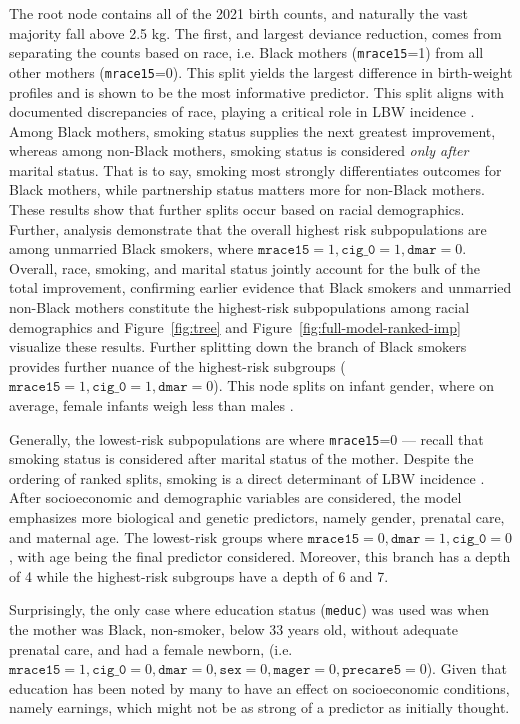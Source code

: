 The root node contains all of the 2021 birth counts, and naturally the vast majority fall above 2.5 kg. The first, and largest deviance reduction, comes from separating the counts based on race, i.e. Black mothers (\texttt{mrace15}=1) from all other mothers (\texttt{mrace15}=0). This split yields the largest difference in birth-weight profiles and is shown to be the most informative predictor. This split aligns with documented discrepancies of race, playing a critical role in LBW incidence \parencite{kff_maternal_infant_health_a, pmc1751798}. Among Black mothers, smoking status supplies the next greatest improvement, whereas among non-Black mothers, smoking status is considered \emph{only after} marital status. That is to say, smoking most strongly differentiates outcomes for Black mothers, while partnership status matters more for non-Black mothers. These results show that further splits occur based on racial demographics. Further, analysis demonstrate that the overall highest risk subpopulations are among unmarried Black smokers, where \(\texttt{mrace15}=1,\texttt{cig\_0}=1, \texttt{dmar}=0\). Overall, race, smoking, and marital status jointly account for the bulk of the total improvement, confirming earlier evidence that Black smokers and unmarried non-Black mothers constitute the highest-risk subpopulations among racial demographics \parencite{kff_maternal_infant_health_a,pmc1751798, smoking_lbw} and Figure~\ref{fig:tree} and Figure~\ref{fig:full-model-ranked-imp} visualize these results. Further splitting down the branch of Black smokers provides further nuance of the highest-risk subgroups (\(\texttt{mrace15}=1,\texttt{cig\_0}=1, \texttt{dmar}=0\)). This node splits on infant gender, where on average, female infants weigh less than males \parencite{decreasing_sex_diff_birth_weight2009}. 

Generally, the lowest-risk subpopulations are where \texttt{mrace15}=0 — recall that smoking status is considered after marital status of the mother. Despite the ordering of ranked splits, smoking is a direct determinant of LBW incidence \parencite{smoking_lbw}. After socioeconomic and demographic variables are considered, the model emphasizes more biological and genetic predictors, namely gender, prenatal care, and maternal age. The lowest-risk groups where \(\texttt{mrace15}=0, \texttt{dmar}=1,\texttt{cig\_0}=0\), with age being the final predictor considered. Moreover, this branch has a depth of 4 while the highest-risk subgroups have a depth of 6 and 7. 

Surprisingly, the only case where education status (\texttt{meduc}) was used was when the mother was Black, non-smoker, below 33 years old, without adequate prenatal care, and had a female newborn, (i.e. \(\texttt{mrace15} = 1, \texttt{cig\_0} = 0,\texttt{dmar}=0, \texttt{sex}=0, \texttt{mager}=0,\texttt{precare5}=0\)). Given that education has been noted by many \parencite{edu_lbw} to have an effect on socioeconomic conditions, namely earnings, which might not be as strong of a predictor as initially thought.

